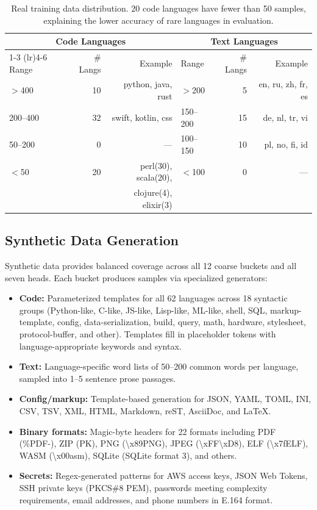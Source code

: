 \documentclass[11pt,a4paper]{article}
\begin{document}
\begin{table}[h]
\centering
\begin{tabular}{lrrlrr}
\toprule
\multicolumn{3}{c}{\textbf{Code Languages}} & \multicolumn{3}{c}{\textbf{Text Languages}} \\
\cmidrule(lr){1-3} \cmidrule(lr){4-6}
Range & \# Langs & Example & Range & \# Langs & Example \\
\midrule
$>$400 & 10 & python, java, rust & $>$200 & 5 & en, ru, zh, fr, es \\
200--400 & 32 & swift, kotlin, css & 150--200 & 15 & de, nl, tr, vi \\
50--200 & 0 & --- & 100--150 & 10 & pl, no, fi, id \\
$<$50   & 20 & perl(30), scala(20), & $<$100  & 0 & --- \\
        &    & clojure(4), elixir(3) &        &    & \\
\bottomrule
\end{tabular}
\caption{\label{tab:data_dist} Real training data distribution. 20 code languages have fewer than 50 samples, explaining the lower accuracy of rare languages in evaluation.}
\end{table}

\subsection{Synthetic Data Generation}

Synthetic data provides balanced coverage across all 12 coarse buckets and all seven heads.
Each bucket produces samples via specialized generators:

\begin{itemize}[noitemsep]
  \item \textbf{Code:} Parameterized templates for all 62 languages across 18 syntactic groups (Python-like, C-like, JS-like, Lisp-like, ML-like, shell, SQL, markup-template, config, data-serialization, build, query, math, hardware, stylesheet, protocol-buffer, and other). Templates fill in placeholder tokens with language-appropriate keywords and syntax.
  \item \textbf{Text:} Language-specific word lists of 50--200 common words per language, sampled into 1--5 sentence prose passages.
  \item \textbf{Config/markup:} Template-based generation for JSON, YAML, TOML, INI, CSV, TSV, XML, HTML, Markdown, reST, AsciiDoc, and \LaTeX.
  \item \textbf{Binary formats:} Magic-byte headers for 22 formats including PDF (\%PDF-), ZIP (PK), PNG (\textbackslash x89PNG), JPEG (\textbackslash xFF\textbackslash xD8), ELF (\textbackslash x7fELF), WASM (\textbackslash x00asm), SQLite (SQLite format 3), and others.
  \item \textbf{Secrets:} Regex-generated patterns for AWS access keys, JSON Web Tokens, SSH private keys (PKCS\#8 PEM), passwords meeting complexity requirements, email addresses, and phone numbers in E.164 format.
\end{itemize}
\end{document}
